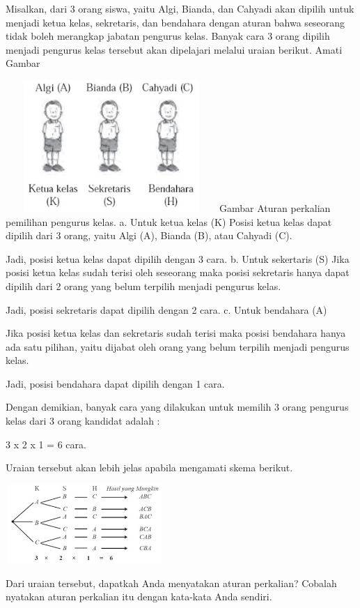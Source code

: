 \documentclass[11pt,fleqn]{book} %
\begin{document}
 Misalkan, dari 3 orang siswa, yaitu Algi, Bianda, dan Cahyadi akan dipilih untuk menjadi ketua kelas, sekretaris, dan bendahara dengan aturan bahwa seseorang tidak boleh merangkap jabatan pengurus kelas. Banyak cara 3 orang dipilih menjadi pengurus kelas tersebut akan dipelajari melalui uraian berikut. Amati Gambar
 
 \includegraphics[width = 8cm, height= 5cm]{Pictures/gen1.png}
Gambar  Aturan perkalian pemilihan pengurus kelas.
a. Untuk ketua kelas (K)
 Posisi ketua kelas dapat dipilih dari 3 orang, yaitu Algi  (A), Bianda (B), atau Cahyadi (C).

 Jadi, posisi ketua kelas dapat dipilih dengan 3 cara.
b. Untuk sekertaris (S)
 Jika posisi ketua kelas sudah terisi oleh seseorang maka  posisi sekretaris hanya dapat dipilih dari 2 orang yang belum terpilih menjadi pengurus kelas. 

 Jadi, posisi sekretaris dapat dipilih dengan 2 cara.
c. Untuk bendahara (A)
 
Jika posisi ketua kelas dan sekretaris sudah terisi maka posisi bendahara hanya ada satu pilihan, yaitu dijabat oleh orang yang belum terpilih menjadi pengurus kelas.

Jadi, posisi bendahara dapat dipilih dengan 1 cara.

Dengan demikian, banyak cara yang dilakukan untuk memilih 3 orang pengurus kelas dari 3 orang kandidat adalah :

3 x 2 x 1 = 6 cara.

Uraian tersebut akan lebih jelas apabila mengamati skema berikut.


\includegraphics[width = 6cm, height= 3cm]{Pictures/gen2.png}

Dari uraian tersebut, dapatkah Anda menyatakan aturan perkalian? Cobalah nyatakan aturan perkalian itu dengan kata-kata Anda sendiri.
\end{document}
